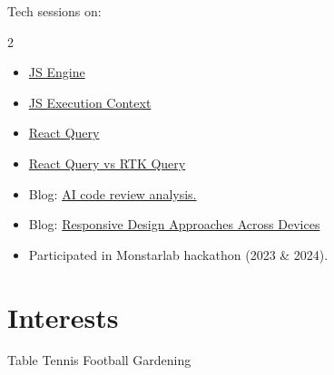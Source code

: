 \documentclass[11pt,a4paper]{article}
\begin{document}
\noindent Tech sessions on:
\begin{multicols}{2}
\begin{itemize}[leftmargin=16pt, nosep]
    \item \href{https://docs.google.com/presentation/d/1xjFLym2X9WOoj7Q16_mH7VWW_SJ7DFnv/edit?usp=sharing&ouid=100634672342634457425&rtpof=true&sd=true}{JS Engine}
    \item \href{https://docs.google.com/presentation/d/1TUGBY-8C-YOUm-CnOhk9EqQoxsvuthSf/edit?usp=sharing&ouid=100634672342634457425&rtpof=true&sd=true}{JS Execution Context}
    \item \href{https://docs.google.com/presentation/d/1Uytrqu6ibIR-9olpFifWpqo4gdNvCAln/edit?usp=sharing&ouid=100634672342634457425&rtpof=true&sd=true}{React Query}
    \item \href{https://docs.google.com/presentation/d/1uYG9mzbKJM8KkgcCsmLXGSRrkqcaHk82/edit?usp=sharing&ouid=100634672342634457425&rtpof=true&sd=true}{React Query vs RTK Query}
\end{itemize}
\end{multicols}

\noindent
\begin{itemize}[leftmargin=16pt, nosep]
    \item Blog: \href{https://docs.google.com/document/d/19ihkkZDN5kY571veC-wDZbDn_TI7613KgiTOLr_yrmo/edit?tab=t.0#heading=h.c2h1ny55aoij}{AI code review analysis.}
    \item Blog: \href{https://endurable-moon-712.notion.site/Responsive-Design-approaches-Across-Devices-4acbf535cfb8425794e9bf36b3fd58d0?pvs=4}{Responsive Design Approaches Across Devices}
    \item Participated in Monstarlab hackathon (2023 \& 2024).
\end{itemize}

\section{Interests}

Table Tennis \textbar{} Football \textbar{} Gardening
\end{document}

